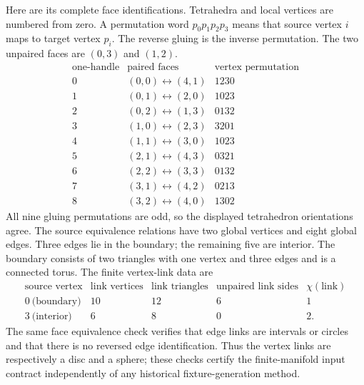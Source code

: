 Here are its complete face identifications.  Tetrahedra and local vertices
are numbered from zero.  A permutation word $p_0p_1p_2p_3$ means that
source vertex $i$ maps to target vertex $p_i$.  The reverse gluing is the
inverse permutation.  The two unpaired faces are $(0,3)$ and $(1,2)$.
\[
\begin{array}{c|c|c}
 \text{one-handle}&\text{paired faces}&\text{vertex permutation}\\
 \hline
 0&(0,0)\leftrightarrow(4,1)&1230\\
 1&(0,1)\leftrightarrow(2,0)&1023\\
 2&(0,2)\leftrightarrow(1,3)&0132\\
 3&(1,0)\leftrightarrow(2,3)&3201\\
 4&(1,1)\leftrightarrow(3,0)&1023\\
 5&(2,1)\leftrightarrow(4,3)&0321\\
 6&(2,2)\leftrightarrow(3,3)&0132\\
 7&(3,1)\leftrightarrow(4,2)&0213\\
 8&(3,2)\leftrightarrow(4,0)&1302
\end{array}
\]
All nine gluing permutations are odd, so the displayed tetrahedron
orientations agree.  The source equivalence relations have two global
vertices and eight global edges.  Three edges lie in the boundary; the
remaining five are interior.  The boundary consists of two triangles
with one vertex and three edges and is a connected torus.  The finite
vertex-link data are
\[
\begin{array}{c|c|c|c|c}
 \text{source vertex}&\text{link vertices}&\text{link triangles}
       &\text{unpaired link sides}&\chi(\text{link})\\
 \hline
 0\ \text{(boundary)}&10&12&6&1\\
 3\ \text{(interior)}&6&8&0&2.
\end{array}
\]
The same face equivalence check verifies that edge links are intervals
or circles and that there is no reversed edge identification.  Thus the
vertex links are respectively a disc and a sphere; these checks certify
the finite-manifold input contract independently of any historical
fixture-generation method.

